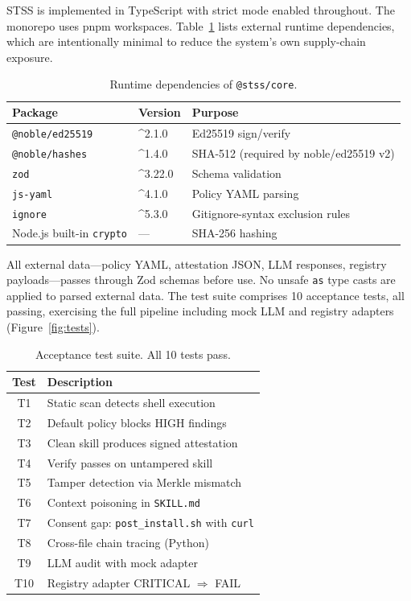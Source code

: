 \documentclass[11pt,twocolumn]{article}
\begin{document}
STSS is implemented in TypeScript with strict mode enabled throughout.
The monorepo uses pnpm workspaces. Table~\ref{tab:deps} lists external
runtime dependencies, which are intentionally minimal to reduce the
system's own supply-chain exposure.

\begin{table}[t]
\centering
\caption{Runtime dependencies of \texttt{@stss/core}.}
\label{tab:deps}
\renewcommand{\arraystretch}{1.1}
\scriptsize
\begin{tabular}{lll}
\toprule
\textbf{Package} & \textbf{Version} & \textbf{Purpose} \\
\midrule
\texttt{@noble/ed25519} & \^{}2.1.0 & Ed25519 sign/verify \\
\texttt{@noble/hashes}  & \^{}1.4.0 & SHA-512 (required by noble/ed25519 v2) \\
\texttt{zod}            & \^{}3.22.0 & Schema validation \\
\texttt{js-yaml}        & \^{}4.1.0 & Policy YAML parsing \\
\texttt{ignore}         & \^{}5.3.0 & Gitignore-syntax exclusion rules \\
\midrule
Node.js built-in \texttt{crypto} & — & SHA-256 hashing \\
\bottomrule
\end{tabular}
\end{table}

All external data---policy YAML, attestation JSON, LLM responses, registry
payloads---passes through Zod schemas before use. No unsafe \texttt{as}
type casts are applied to parsed external data. The test suite comprises
10 acceptance tests, all passing, exercising the full pipeline including
mock LLM and registry adapters (Figure~\ref{fig:tests}).

\begin{table}[t]
\centering
\caption{Acceptance test suite. All 10 tests pass.}
\label{tab:tests}
\renewcommand{\arraystretch}{1.1}
\scriptsize
\begin{tabular}{cl}
\toprule
\textbf{Test} & \textbf{Description} \\
\midrule
T1 & Static scan detects shell execution \\
T2 & Default policy blocks HIGH findings \\
T3 & Clean skill produces signed attestation \\
T4 & Verify passes on untampered skill \\
T5 & Tamper detection via Merkle mismatch \\
T6 & Context poisoning in \texttt{SKILL.md} \\
T7 & Consent gap: \texttt{post\_install.sh} with \texttt{curl} \\
T8 & Cross-file chain tracing (Python) \\
T9 & LLM audit with mock adapter \\
T10 & Registry adapter CRITICAL $\Rightarrow$ FAIL \\
\bottomrule
\end{tabular}
\end{table}
\end{document}
